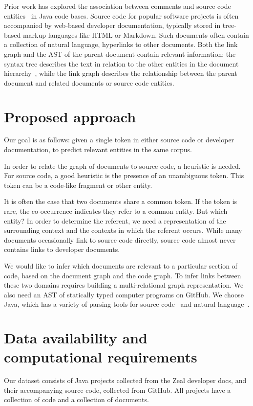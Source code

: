 \documentclass{article}
\begin{document}
Prior work has explored the association between comments and source code entities~\citep{panthaplackel2020associating} in Java code bases. Source code for popular software projects is often accompanied by web-based developer documentation, typically stored in tree-based markup languages like HTML or Markdown. Such documents often contain a collection of natural language, hyperlinks to other documents. Both the link graph and the AST of the parent document contain relevant information: the syntax tree describes the text in relation to the other entities in the document hierarchy~\citep{yang2016hierarchical}, while the link graph describes the relationship between the parent document and related documents or source code entities.

\section{Proposed approach}

Our goal is as follows: given a single token in either source code or developer documentation, to predict relevant entities in the same corpus.

In order to relate the graph of documents to source code, a heuristic is needed. For source code, a good heuristic is the presence of an unambiguous token. This token can be a code-like fragment or other entity.

It is often the case that two documents share a common token. If the token is rare, the co-occurrence indicates they refer to a common entity. But which entity? In order to determine the referent, we need a representation of the surrounding context and the contexts in which the referent occurs. While many documents occasionally link to source code directly, source code almost never contains links to developer documents.

We would like to infer which documents are relevant to a particular section of code, based on the document graph and the code graph. To infer links between these two domains requires building a multi-relational graph representation. We also need an AST of statically typed computer programs on GitHub. We choose Java, which has a variety of parsing tools for source code~\citep{kovalenko2019pathminer} and natural language~\citep{grella2018non}.

\section{Data availability and computational requirements}

Our dataset consists of Java projects collected from the Zeal developer docs, and their accompanying source code, collected from GitHub. All projects have a collection of code and a collection of documents.



\end{document}
